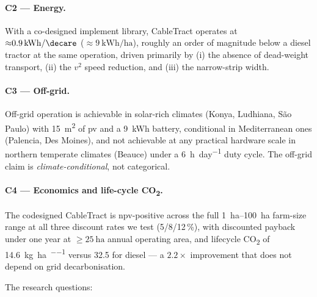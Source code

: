 \documentclass[11pt,a4paper]{article}
\begin{document}
\paragraph{C2 --- Energy.} With a co-designed implement library, CableTract operates at ${\approx}\SI{0.9}{\kWh\per\decare}$ (${\approx}\SI{9}{\kWh\per\hectare}$), roughly an order of magnitude below a diesel tractor at the same operation, driven primarily by (i) the absence of dead-weight transport, (ii) the $v^2$ speed reduction, and (iii) the narrow-strip width.

\paragraph{C3 --- Off-grid.} Off-grid operation is achievable in solar-rich climates (Konya, Ludhiana, São Paulo) with \SI{15}{\meter\squared} of \gls{pv} and a \SI{9}{\kWh} battery, conditional in Mediterranean ones (Palencia, Des Moines), and not achievable at any practical hardware scale in northern temperate climates (Beauce) under a \SI{6}{\hour\per day} duty cycle. The off-grid claim is \emph{climate-conditional}, not categorical.

\paragraph{C4 --- Economics and life-cycle CO\textsubscript{2}.} The codesigned CableTract is \gls{npv}-positive across the full \SIrange{1}{100}{\hectare} farm-size range at all three discount rates we test (5/8/12\,\%), with discounted payback under one year at $\geq\!\SI{25}{\hectare}$ annual operating area, and lifecycle CO\textsubscript{2} of \SI{14.6}{\kilogram\per\hectare\per\year} versus 32.5 for diesel --- a $2.2\times$ improvement that does not depend on grid decarbonisation.

\medskip
The research questions:
\end{document}
